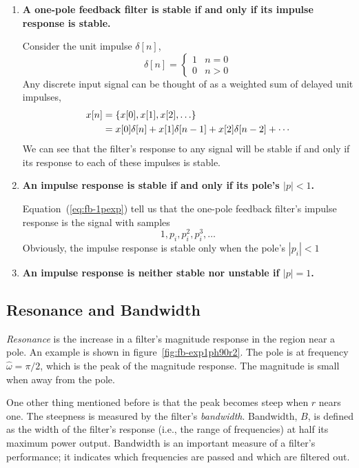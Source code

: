 \begin{enumerate}
\item \textbf{A one-pole feedback filter is stable if and only if its
impulse response is stable.}

Consider the unit impulse $\delta[n]$,
\begin{equation}
\delta[n] = 
\left\{\begin{array}{rl}
1 & n=0\\
0 & n>0
\end{array}\right.
\end{equation}
Any discrete input signal can be thought of as a weighted sum of
delayed unit impulses,
\begin{align}
x[n] &= \{x[0], x[1], x[2], \ldots\} \notag \\
     &= x[0]\delta[n] + x[1]\delta[n-1] + x[2]\delta[n-2] + \cdots
\end{align}
We can see that the filter's response to any signal will be stable if
and only if its response to each of these impulses is stable.

\item \textbf{An impulse response is stable if and only if its pole's
$|p|<1$.}

Equation~(\ref{eq:fb-1pexp}) tell us that the 
one-pole feedback filter's impulse response is the signal with samples
\begin{equation}
1, p_i, p_i^2, p_i^3, \ldots
\end{equation}
Obviously, the impulse response is stable only when the pole's $|p_i|<1$

\item \textbf{An impulse response is neither stable nor unstable if
$|p|=1$.}
\end{enumerate}

\subsection{Resonance and Bandwidth}

\emph{Resonance} is the increase in a filter's magnitude response in
the region near a pole. An example is shown in
figure~\ref{fig:fb-exp1ph90r2}. The pole is at frequency
$\hat{\omega}=\pi/2$, which is the peak of the magnitude response. The
magnitude is small when away from the pole.

One other thing mentioned before is that the peak becomes steep
when $r$ nears one. The steepness is measured by the filter's
\emph{bandwidth}.
Bandwidth, $B$, is defined as the width of the
filter's response (i.e., the range of frequencies) at half its maximum
power output. Bandwidth is an important measure of a filter's
performance; it indicates which frequencies are passed and which are
filtered out.

